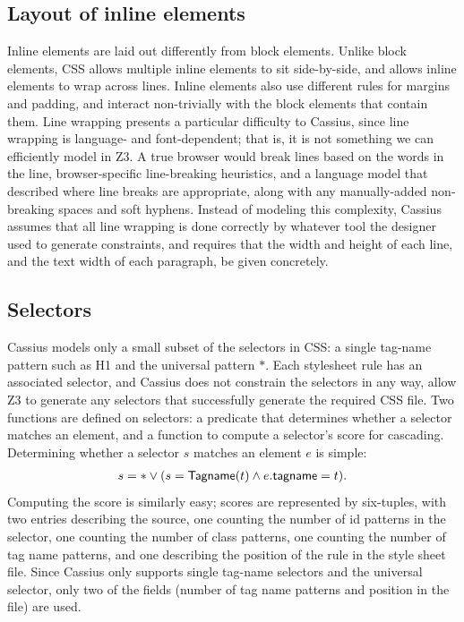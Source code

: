 \documentclass[10pt]{sigplanconf}
\newcommand{\name}{Cassius\xspace}
\newenvironment{pseudocode}
{ \footnotesize \[ \begin{array}{l} }
{ \end{array} \] }
\newcommand{\T}[1]{\text{\textsf{#1}}}
\begin{document}
\subsection{Layout of inline elements}
Inline elements are laid out differently from block elements.
Unlike block elements,
  CSS allows multiple inline elements to sit side-by-side,
  and allows inline elements to wrap across lines.
Inline elements also use different rules for margins and padding,
  and interact non-trivially with the block elements that contain them.
Line wrapping presents a particular difficulty to \name,
  since line wrapping is language- and font-dependent;
  that is, it is not something we can efficiently model in Z3.
A true browser would break lines based on the words in the line,
  browser-specific line-breaking heuristics,
  and a language model that described where line breaks are appropriate,
  along with any manually-added non-breaking spaces and soft hyphens.
Instead of modeling this complexity,
  \name assumes that all line wrapping is done correctly
  by whatever tool the designer used to generate constraints,
  and requires that the width and height of each line,
  and the text width of each paragraph, be given concretely.

\subsection{Selectors}

\name models only a small subset of the selectors in CSS:\@
  a single tag-name pattern such as \textsf{H1}
  and the universal pattern $*$.
Each stylesheet rule has an associated selector,
  and \name does not constrain the selectors in any way,
  allow Z3 to generate any selectors
  that successfully generate the required CSS file.
Two functions are defined on selectors:
  a predicate that determines whether a selector matches an element,
  and a function to compute a selector's score for cascading.
Determining whether a selector $s$ matches an element $e$ is simple:
\begin{pseudocode}
s = * \lor (s = \T{Tagname}(t) \land e.\T{tagname} = t).
\end{pseudocode}
Computing the score is similarly easy;
  scores are represented by six-tuples,
  with two entries describing the source,
  one counting the number of id patterns in the selector,
  one counting the number of class patterns,
  one counting the number of tag name patterns,
  and one describing the position of the rule in the style sheet file.
Since \name only supports single tag-name selectors
  and the universal selector,
  only two of the fields
  (number of tag name patterns and position in the file)
  are used.
\end{document}
